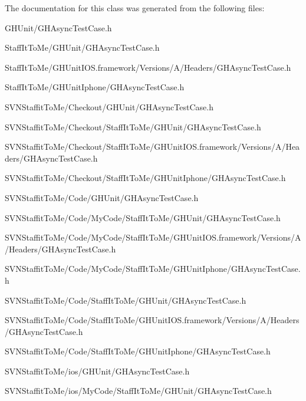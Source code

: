 \-The documentation for this class was generated from the following files\-:\begin{DoxyCompactItemize}
\item 
\-G\-H\-Unit/\-G\-H\-Async\-Test\-Case.\-h\item 
\-Staff\-It\-To\-Me/\-G\-H\-Unit/\-G\-H\-Async\-Test\-Case.\-h\item 
\-Staff\-It\-To\-Me/\-G\-H\-Unit\-I\-O\-S.\-framework/\-Versions/\-A/\-Headers/\-G\-H\-Async\-Test\-Case.\-h\item 
\-Staff\-It\-To\-Me/\-G\-H\-Unit\-Iphone/\-G\-H\-Async\-Test\-Case.\-h\item 
\-S\-V\-N\-Staffit\-To\-Me/\-Checkout/\-G\-H\-Unit/\-G\-H\-Async\-Test\-Case.\-h\item 
\-S\-V\-N\-Staffit\-To\-Me/\-Checkout/\-Staff\-It\-To\-Me/\-G\-H\-Unit/\-G\-H\-Async\-Test\-Case.\-h\item 
\-S\-V\-N\-Staffit\-To\-Me/\-Checkout/\-Staff\-It\-To\-Me/\-G\-H\-Unit\-I\-O\-S.\-framework/\-Versions/\-A/\-Headers/\-G\-H\-Async\-Test\-Case.\-h\item 
\-S\-V\-N\-Staffit\-To\-Me/\-Checkout/\-Staff\-It\-To\-Me/\-G\-H\-Unit\-Iphone/\-G\-H\-Async\-Test\-Case.\-h\item 
\-S\-V\-N\-Staffit\-To\-Me/\-Code/\-G\-H\-Unit/\-G\-H\-Async\-Test\-Case.\-h\item 
\-S\-V\-N\-Staffit\-To\-Me/\-Code/\-My\-Code/\-Staff\-It\-To\-Me/\-G\-H\-Unit/\-G\-H\-Async\-Test\-Case.\-h\item 
\-S\-V\-N\-Staffit\-To\-Me/\-Code/\-My\-Code/\-Staff\-It\-To\-Me/\-G\-H\-Unit\-I\-O\-S.\-framework/\-Versions/\-A/\-Headers/\-G\-H\-Async\-Test\-Case.\-h\item 
\-S\-V\-N\-Staffit\-To\-Me/\-Code/\-My\-Code/\-Staff\-It\-To\-Me/\-G\-H\-Unit\-Iphone/\-G\-H\-Async\-Test\-Case.\-h\item 
\-S\-V\-N\-Staffit\-To\-Me/\-Code/\-Staff\-It\-To\-Me/\-G\-H\-Unit/\-G\-H\-Async\-Test\-Case.\-h\item 
\-S\-V\-N\-Staffit\-To\-Me/\-Code/\-Staff\-It\-To\-Me/\-G\-H\-Unit\-I\-O\-S.\-framework/\-Versions/\-A/\-Headers/\-G\-H\-Async\-Test\-Case.\-h\item 
\-S\-V\-N\-Staffit\-To\-Me/\-Code/\-Staff\-It\-To\-Me/\-G\-H\-Unit\-Iphone/\-G\-H\-Async\-Test\-Case.\-h\item 
\-S\-V\-N\-Staffit\-To\-Me/ios/\-G\-H\-Unit/\-G\-H\-Async\-Test\-Case.\-h\item 
\-S\-V\-N\-Staffit\-To\-Me/ios/\-My\-Code/\-Staff\-It\-To\-Me/\-G\-H\-Unit/\-G\-H\-Async\-Test\-Case.\-h\item 

\end{DoxyCompactItemize}
